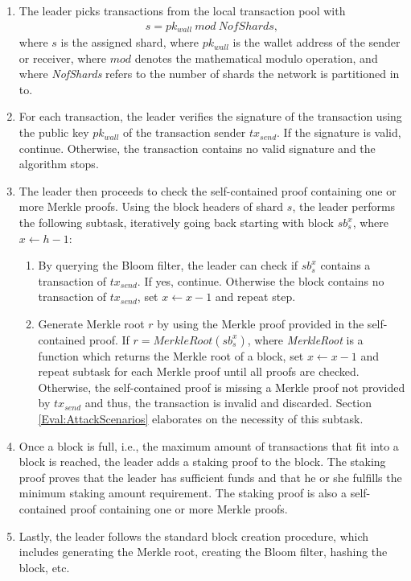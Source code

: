\begin{enumerate}
  \item The leader picks transactions from the local transaction pool with
    \begin{gather}
    \label{eq:NetworkSharding}
      s = pk_{wall}\ mod\ NofShards,
    \end{gather}
    where $s$ is the assigned shard, where $pk_{wall}$ is the wallet address of the sender or receiver, where $mod$ denotes the mathematical modulo operation, and where \textit{NofShards} refers to the number of shards the network is partitioned in to.
  \item For each transaction, the leader verifies the signature of the transaction using the public key $pk_{wall}$ of the transaction sender $tx_{send}$. If the signature is valid, continue. Otherwise, the transaction contains no valid signature and the algorithm stops.
  \item The leader then proceeds to check the self-contained proof containing one or more Merkle proofs. Using the block headers of shard $s$, the leader performs the following subtask, iteratively going back starting with block $sb_s^{x}$, where $x \leftarrow h - 1$:
    \begin{enumerate}
      \item By querying the Bloom filter, the leader can check if $sb_s^{x}$ contains a transaction of $tx_{send}$. If yes, continue. Otherwise the block contains no transaction of $tx_{send}$, set $x \leftarrow x - 1$ and repeat step.
      \item Generate Merkle root $r$ by using the Merkle proof provided in the self-contained proof. If $r = MerkleRoot(sb_s^{x})$, where \textit{MerkleRoot} is a function which returns the Merkle root of a block, set $x \leftarrow x - 1$ and repeat subtask for each Merkle proof until all proofs are checked. Otherwise, the self-contained proof is missing a Merkle proof not provided by $tx_{send}$ and thus, the transaction is invalid and discarded. Section \ref{Eval:AttackScenarios} elaborates on the necessity of this subtask.
    \end{enumerate} 
  \item Once a block is full, i.e., the maximum amount of transactions that fit into a block is reached, the leader adds a staking proof to the block. The staking proof proves that the leader has sufficient funds and that he or she fulfills the minimum staking amount requirement. The staking proof is also a self-contained proof containing one or more Merkle proofs. 
  \item Lastly, the leader follows the standard block creation procedure, which includes generating the Merkle root, creating the Bloom filter, hashing the block, etc.
\end{enumerate}

